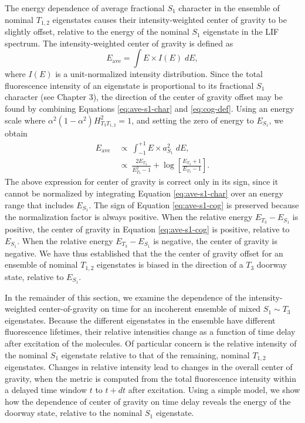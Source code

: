 \documentclass[12pt]{mitthesis}
\begin{document}
The energy dependence of average fractional $S_1$ character in the
ensemble of nominal $T_{1,2}$ eigenstates causes their
intensity-weighted center of gravity to be slightly offset, relative
to the energy of the nominal $S_1$ eigenstate in the LIF spectrum.
The intensity-weighted center of gravity is defined as
\begin{equation}
  \label{eq:cog-def}
  E_{\text{ave}} = \int E \times I(E) \; dE,
\end{equation}
where $I(E)$ is a unit-normalized intensity distribution.  Since the
total fluorescence intensity of an eigenstate is proportional to its
fractional $S_1$ character (see Chapter 3), the direction of the
center of gravity offset may be found by combining Equations
\ref{eq:ave-s1-char} and \ref{eq:cog-def}.  Using an energy scale
where $\alpha^2 (1-\alpha^2) H_{T_3T_{1,2}}^2 = 1$, and setting the
zero of energy to $E_{S_1}$, we obtain
\begin{equation}
  \label{eq:ave-s1-cog}
  \begin{split}
    E_{\text{ave}} \: 
    &\propto \: \int_{-1}^{+1} E \times a_{S_1}^2 \; dE,\\
    &\propto \: \frac{2 E_{T_3}}{E_{T_3}^2 - 1} + \log
    \left[
      \frac{E_{T_3}+1}{E_{T_3}-1}
    \right].
  \end{split}
\end{equation}
The above expression for center of gravity is correct only in its
sign, since it cannot be normalized by integrating Equation
\ref{eq:ave-s1-char} over an energy range that includes $E_{S_1}$.
The sign of Equation \ref{eq:ave-s1-cog} is preserved because the
normalization factor is always positive.  When the relative energy
$E_{T_3} - E_{S_1}$ is positive, the center of gravity in Equation
\ref{eq:ave-s1-cog} is positive, relative to $E_{S_1}$.  When the
relative energy $E_{T_3} - E_{S_1}$ is negative, the center of gravity
is negative.  We have thus established that the the center of gravity
offset for an ensemble of nominal $T_{1,2}$ eigenstates is biased in
the direction of a $T_3$ doorway state, relative to $E_{S_1}$.

In the remainder of this section, we examine the dependence of the
intensity-weighted center-of-gravity on time for an incoherent
ensemble of mixed $S_1 \sim T_3$ eigenstates.  Because the different
eigenstates in the ensemble have different fluorescence lifetimes,
their relative intensities change as a function of time delay after
excitation of the molecules.  Of particular concern is the relative
intensity of the nominal $S_1$ eigenstate relative to that of the
remaining, nominal $T_{1,2}$ eigenstates.  Changes in relative
intensity lead to changes in the overall center of gravity, when the
metric is computed from the total fluorescence intensity within a
delayed time window $t$ to $t+dt$ after excitation.  Using a simple
model, we show how the dependence of center of gravity on time delay
reveals the energy of the doorway state, relative to the nominal $S_1$
eigenstate.
\end{document}
